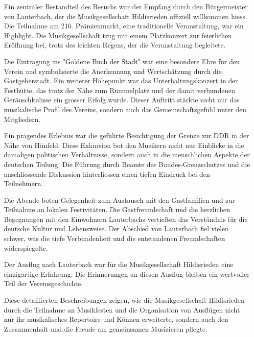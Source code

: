 \begin{history}
\begin{itemize}
        Ein zentraler Bestandteil des Besuchs war der Empfang durch den
        Bürgermeister von Lauterbach, der die Musikgesellschaft Hildisrieden
        offiziell willkommen hiess. Die Teilnahme am 216. Prämienmarkt, eine
        traditionelle Veranstaltung, war ein Highlight. Die Musikgesellschaft
        trug mit einem Platzkonzert zur feierlichen Eröffnung bei, trotz des
        leichten Regens, der die Veranstaltung begleitete.

        Die Eintragung ins "Goldene Buch der Stadt" war eine besondere Ehre für
        den Verein und symbolisierte die Anerkennung und Wertschätzung durch die
        Gastgeberstadt. Ein weiterer Höhepunkt war das Unterhaltungskonzert in
        der Festhütte, das trotz der Nähe zum Rummelplatz und der damit
        verbundenen Geräuschkulisse ein grosser Erfolg wurde. Dieser Auftritt
        stärkte nicht nur das musikalische Profil des Vereins, sondern auch das
        Gemeinschaftsgefühl unter den Mitgliedern.

        Ein prägendes Erlebnis war die geführte Besichtigung der Grenze zur DDR
        in der Nähe von Hünfeld. Diese Exkursion bot den Musikern nicht nur
        Einblicke in die damaligen politischen Verhältnisse, sondern auch in die
        menschlichen Aspekte der deutschen Teilung. Die Führung durch Beamte des
        Bundes-Grenzschutzes und die anschliessende Diskussion hinterliessen
        einen tiefen Eindruck bei den Teilnehmern.

        Die Abende boten Gelegenheit zum Austausch mit den Gastfamilien und zur
        Teilnahme an lokalen Festivitäten. Die Gastfreundschaft und die
        herzlichen Begegnungen mit den Einwohnern Lauterbachs vertieften das
        Verständnis für die deutsche Kultur und Lebensweise. Der Abschied von
        Lauterbach fiel vielen schwer, was die tiefe Verbundenheit und die
        entstandenen Freundschaften widerspiegelte.

        Der Ausflug nach Lauterbach war für die Musikgesellschaft Hildisrieden
        eine einzigartige Erfahrung. Die Erinnerungen an diesen Ausflug bleiben
        ein wertvoller Teil der Vereinsgeschichte.


    \end{itemize}
    Diese detaillierten Beschreibungen zeigen, wie die Musikgesellschaft
    Hildisrieden durch die Teilnahme an Musikfesten und die Organisation von
    Ausflügen nicht nur ihr musikalisches Repertoire und Können erweiterte,
    sondern auch den Zusammenhalt und die Freude am gemeinsamen Musizieren
    pflegte.


\end{history}
